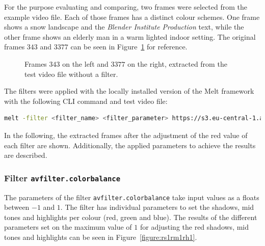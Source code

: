 \documentclass[../MasterThesis.tex]{subfiles}
\begin{document}
For the purpose evaluating and comparing, two frames were selected from the example video file. Each of those frames has a distinct colour schemes. One frame shows a snow landscape and the \textit{Blender Institute Production} text, while the other frame shows an elderly man in a warm lighted indoor setting. The original frames $343$ and $3377$ can be seen in Figure~\ref{figure:nofilter} for reference.


\begin{figure}[H]
	\begin{center}
		\caption[Frames $343$ and $3377$ from the test video file without a filter.]{Frames $343$ on the left and $3377$ on the right, extracted from the test video file without a filter.}
		\label{figure:nofilter}
	\end{center}
\end{figure}



The filters were applied with the locally installed version of the Melt framework with the following CLI command and test video file:
\begin{lstlisting}[language=bash, numbers=none]
	melt -filter <filter_name> <filter_parameter> https://s3.eu-central-1.amazonaws.com/accurate-player-demo-assets/timecode/sintel-2048-timecode-stereo.mp4 -consumer xgl
\end{lstlisting}


In the following, the extracted frames after the adjustment of the red value of each filter are shown. Additionally, the applied parameters to achieve the results are described.













\subsubsection*{Filter \texttt{avfilter.colorbalance}}

The parameters of the filter \texttt{avfilter.colorbalance} take input values as a floats between $-1$ and $1$. The filter has individual parameters to set the shadows, mid tones and highlights per colour (red, green and blue). The results of the different parameters set on the maximum value of $1$ for adjusting the red shadows, mid tones and highlights can be seen in Figure~\ref{figure:rs1rm1rh1}.
\end{document}
